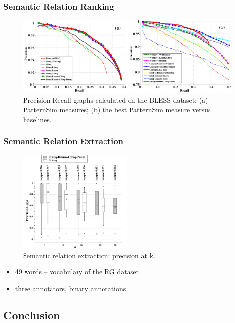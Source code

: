 \documentclass{beamer}
\begin{document}
\begin{frame}
\frametitle{Semantic Relation Ranking}

\begin{figure}	
	\centering
	\includegraphics[width=1.0\textwidth]{figures/pr2}
	\caption{Precision-Recall graphs calculated on the BLESS dataset: (a) PatternSim measures; (b) the best PatternSim measure versus baselines.
	}
\end{figure}

\end{frame}

\begin{frame}
\frametitle{Semantic Relation Extraction}

\begin{figure}	
	\centering
	\includegraphics[width=0.5\textwidth]{figures/b}
	\caption{Semantic relation extraction: precision at k.}
\end{figure}

\begin{itemize}
  \item 49 words  -- vocabulary of the RG dataset
  \item three annotators, binary annotations  
\end{itemize}

\end{frame}



\subsection{Conclusion}
\end{document}
